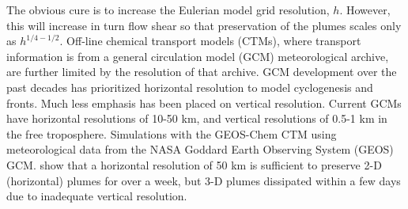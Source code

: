 \documentclass[fleqn, 11pt]{wlscirep}
\begin{document}
The obvious cure is to increase the Eulerian model grid resolution, $h$. However, this will increase in turn flow shear so that preservation of the plumes scales only as $h^{1/4-1/2}$.\cite{rastig}  Off-line chemical transport models (CTMs), where transport information is from a general circulation model (GCM) meteorological archive, are further limited by the resolution of that archive.  GCM development over the past decades has prioritized horizontal resolution to model cyclogenesis and fronts. Much less emphasis has been placed on vertical resolution. Current GCMs have horizontal resolutions of 10-50 km, and vertical resolutions of 0.5-1 km in the free troposphere. Simulations with the GEOS-Chem CTM using meteorological data from the NASA Goddard Earth Observing System (GEOS) GCM. show that a horizontal resolution of 50 km is sufficient to preserve 2-D (horizontal) plumes for over a week, but 3-D plumes dissipated within a few days due to inadequate vertical resolution.\cite{zhuang} \cite{eastham} 
\end{document}
